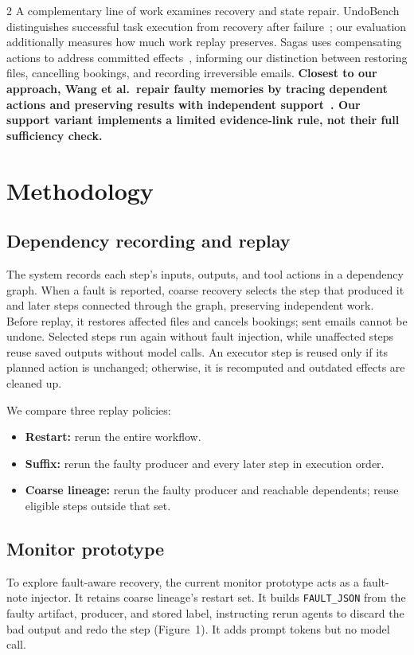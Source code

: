 \documentclass[9pt]{extarticle}
\begin{document}
\begin{multicols}{2}
A complementary line of work examines recovery and state repair. UndoBench distinguishes successful task execution from recovery after failure~\cite{undobench}; our evaluation additionally measures how much work replay preserves. Sagas uses compensating actions to address committed effects~\cite{sagas}, informing our distinction between restoring files, cancelling bookings, and recording irreversible emails. \textbf{Closest to our approach, Wang et al.\ repair faulty memories by tracing dependent actions and preserving results with independent support~\cite{wang2026}. Our support variant implements a limited evidence-link rule, not their full sufficiency check.}

\section{Methodology}
\subsection{Dependency recording and replay}
The system records each step's inputs, outputs, and tool actions in a dependency graph. When a fault is reported, coarse recovery selects the step that produced it and later steps connected through the graph, preserving independent work. Before replay, it restores affected files and cancels bookings; sent emails cannot be undone. Selected steps run again without fault injection, while unaffected steps reuse saved outputs without model calls. An executor step is reused only if its planned action is unchanged; otherwise, it is recomputed and outdated effects are cleaned up.

We compare three replay policies:
\begin{itemize}
\item \textbf{Restart:} rerun the entire workflow.
\item \textbf{Suffix:} rerun the faulty producer and every later step in execution order.
\item \textbf{Coarse lineage:} rerun the faulty producer and reachable dependents; reuse eligible steps outside that set.
\end{itemize}


\subsection{Monitor prototype}
To explore fault-aware recovery, the current monitor prototype acts as a fault-note injector. It retains coarse lineage's restart set. It builds \texttt{FAULT\_JSON} from the faulty artifact, producer, and stored label, instructing rerun agents to discard the bad output and redo the step (Figure~1). It adds prompt tokens but no model call.


\end{multicols}
\end{document}
